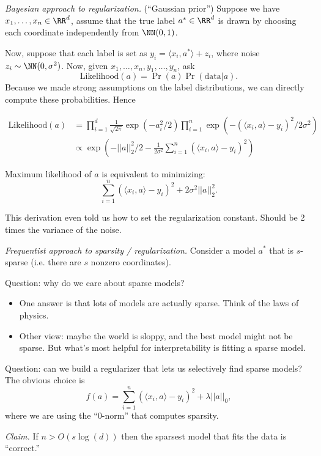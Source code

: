 {\it Bayesian approach to regularization.} (``Gaussian prior'') Suppose we have $x_1, \dots, x_n \in \RR^d$, assume that the true label $a^{*} \in \RR^d$ is drawn by choosing each coordinate independently from $\NN(0, 1)$.

Now, suppose that each label is set as $y_i = \langle x_i, a^{*} \rangle + z_i$, where noise $z_i \sim \NN(0, \sigma^2)$.  Now, given $x_1, \dots, x_n, y_1, \dots, y_n$, ask
\[
  \text{Likelihood}(a) = \Pr(a) \Pr(\text{data} | a).
\]
Because we made strong assumptions on the label distributions, we can directly compute these probabilities.  Hence

\begin{align*}
  \text{Likelihood}(a) &= \prod_{i=1}^{d} \frac{1}{\sqrt{2\pi}}\exp (- a_i^2 / 2) \prod_{i=1}^{n} \exp (- (\langle x_i, a \rangle - y_i)^2 / 2 \sigma^2) \\
  &\propto \exp (-||a||_2^2 / 2 - \frac{1}{2 \sigma^2} \sum_{i=1}^{n} \left( \langle x_i, a \rangle - y_i\right)^2)
\end{align*}

Maximum likelihood of $a$ is equivalent to minimizing:
\[
  \sum_{i=1}^{n} \left( \langle x_i, a \rangle - y_i \right)^2 + 2 \sigma^2 ||a||_{2}^{2}.
\]

This derivation even told us how to set the regularization constant.  Should be 2 times the variance of the noise.

{\it Frequentist approach to sparsity / regularization.} Consider a model $a^{*}$ that is $s$-sparse (i.e. there are $s$ nonzero coordinates).  

Question: why do we care about sparse models?

\begin{itemize}
  \item One answer is that lots of models are actually sparse.  Think of the laws of physics.
  \item Other view: maybe the world is sloppy, and the best model might not be sparse.  But what's most helpful for interpretability is fitting a sparse model.
\end{itemize}

Question: can we build a regularizer that lets us selectively find sparse models?  The obvious choice is
\[
  f(a) = \sum_{i=1}^{n} \left( \langle x_i, a \rangle - y_i \right)^2 + \lambda ||a||_0,
\]
where we are using the ``0-norm'' that computes sparsity.

{\it Claim.} If $n > O (s \log (d))$ then the sparsest model that fits the data is ``correct.''

